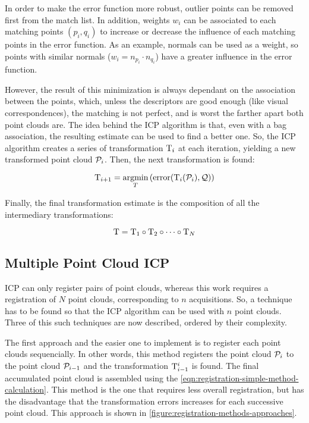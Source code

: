 In order to make the error function more robust, outlier points can be removed first from the match list. In addition, weights $w_i$ can be associated to each matching points $(p_i, q_i)$ to increase or decrease the influence of each matching points in the error function. As an example, normals can be used as a weight, so points with similar normals ($w_i = n_{p_i} \cdot n_{q_i}$) have a greater influence in the error function. 

However, the result of this minimization is always dependant on the association between the points, which, unless the descriptors are good enough (like visual correspondences), the matching is not perfect, and is worst the farther apart both point clouds are. The idea behind the ICP algorithm is that, even with a bag association, the resulting estimate can be used to find a better one. So, the ICP algorithm creates a series of transformation $\mathrm{T}_i$ at each iteration, yielding a new transformed point cloud $\mathcal{P}_i$. Then, the next transformation is found:

\begin{equation}
    \mathrm{T}_{i+1} = \underset{T}{\textrm{argmin}}\left(\textrm{error}(\mathrm{T}_i(\mathcal{P}_i), \mathcal{Q})\right)
\end{equation}

Finally, the final transformation estimate is the composition of all the intermediary transformations:

\begin{equation}
    \mathrm{T} = \mathrm{T}_1 \circ \mathrm{T}_2 \circ \dots \circ \mathrm{T}_N
\end{equation}

\subsection{Multiple Point Cloud ICP}
\label{section:multiple-pointcloud-icp}

ICP can only register pairs of point clouds, whereas this work requires a registration of $N$ point clouds, corresponding to $n$ acquisitions. So, a technique has to be found so that the ICP algorithm can be used with $n$ point clouds. Three of this such techniques are now described, ordered by their complexity.

The first approach and the easier one to implement is to register each point clouds sequencially. In other words, this method registers the point cloud $\mathcal{P}_i$ to the point cloud $\mathcal{P}_{i-1}$ and the transformation $\mathrm{T}_{i-1}^{i}$ is found. The final accumulated point cloud is assembled using the \cref{eqn:registration-simple-method-calculation}. This method is the one that requires less overall registration, but has the disadvantage that the transformation errors increases for each successive point cloud. This approach is shown in \cref{figure:registration-methods-approaches}.

